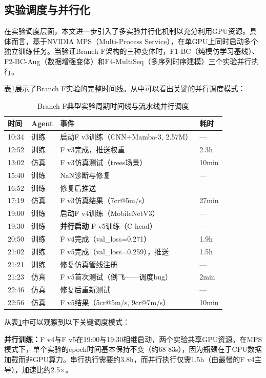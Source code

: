 \subsection{实验调度与并行化}

在实验调度层面，本文进一步引入了多实验并行化机制以充分利用GPU资源。具体而言，基于NVIDIA MPS（Multi-Process Service），在单GPU上同时启动多个独立训练任务。当验证Branch F架构的三种变体时，F1-BC（纯模仿学习基线）、F2-BC-Aug（数据增强变体）和F4-MultiSeq（多序列时序建模）三个实验并行执行。

表\ref{tab:pipeline_timing}展示了Branch F实验的完整时间线。从中可以看出关键的并行调度模式：

\begin{table}[t]
\centering
\caption{Branch F典型实验周期时间线与流水线并行调度}
\label{tab:pipeline_timing}
\begin{tabular}{llll}
\toprule
时间 & Agent & 事件 & 耗时 \\
\midrule
10:34 & 训练 & 启动F v3训练（CNN+Mamba-3, 2.57M） & — \\
12:52 & 训练 & F v3完成，推送权重 & 2.3h \\
13:02 & 仿真 & F v3仿真测试（trees场景） & 10min \\
15:40 & 训练 & NaN诊断与修复 & — \\
16:52 & 训练 & 修复后推送 & — \\
17:19 & 仿真 & F v3仿真结果（7cr@5m/s） & 27min \\
19:00 & 训练 & 启动F v4训练（MobileNetV3） & — \\
19:30 & 训练 & \textbf{并行启动} F v5训练（C head） & — \\
20:50 & 训练 & F v4完成（val\_loss=0.271） & 1.9h \\
21:02 & 训练 & F v5完成（val\_loss=0.259），推送 & 1.5h \\
21:21 & 训练 & 修复仿真管线注册 & — \\
21:23 & 仿真 & F v5首次测试（倒飞——调度bug） & 2min \\
22:46 & 仿真 & 修复后重新测试 & — \\
22:56 & 仿真 & F v5结果（5cr@5m/s, 9cr@7m/s） & 10min \\
\bottomrule
\end{tabular}
\end{table}

从表\ref{tab:pipeline_timing}中可以观察到以下关键调度模式：

\textbf{并行训练：}F v4与F v5在19:00与19:30相继启动，两个实验共享GPU资源。在MPS模式下，单个实验的epoch时间基本保持不变（约68-83s），因为瓶颈在于CPU数据加载而非GPU算力。串行执行需要约3.8h，而并行执行仅需1.5h（由最慢的F v4主导），加速比约2.5$\times$。

